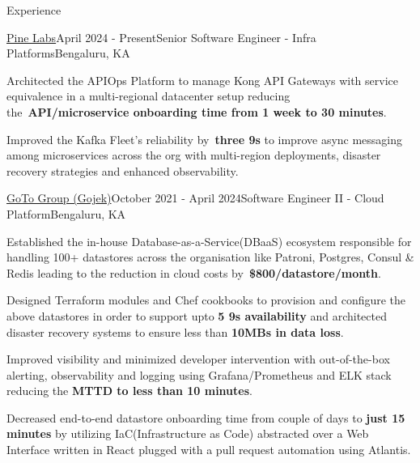 \documentclass[
	11pt, %
]{resume} %
\begin{document}
\begin{rSection}{Experience}

        \begin{rSubsection}{\href{https://www.pinelabs.com/}{Pine Labs}}{April 2024 - Present}{Senior Software Engineer - Infra Platforms}{Bengaluru, KA}
            \item Architected the APIOps Platform to manage Kong API Gateways with service equivalence in a multi-regional datacenter setup reducing the~\textbf{API/microservice onboarding time from 1 week to 30 minutes}.
            \item Improved the Kafka Fleet's reliability by~\textbf{three 9s} to improve async messaging among microservices across the org with multi-region deployments, disaster recovery strategies and enhanced observability.
	\end{rSubsection}


	\begin{rSubsection}{\href{https://www.gotocompany.com/en/about-us}{GoTo Group (Gojek)}}{October 2021 - April 2024}{Software Engineer II - Cloud Platform}{Bengaluru, KA}
		\item Established the in-house Database-as-a-Service(DBaaS) ecosystem responsible for handling 100+ datastores across the organisation like Patroni, Postgres, Consul \& Redis leading to the reduction in cloud costs by~\textbf{\$800/datastore/month}.
		\item Designed Terraform modules and Chef cookbooks to provision and configure the above datastores in order to support upto \textbf{5 9s availability} and architected disaster recovery systems to ensure less than \textbf{10MBs in data loss}.

        \item Improved visibility and minimized developer intervention with out-of-the-box alerting, observability and logging using Grafana/Prometheus and ELK stack reducing the \textbf{MTTD to less than 10 minutes}.
          
          \item Decreased end-to-end datastore onboarding time from couple of days to \textbf{just 15 minutes} by utilizing IaC(Infrastructure as Code) abstracted over a Web Interface written in React plugged with a pull request automation using Atlantis.
	\end{rSubsection}



\end{rSection}
\end{document}
